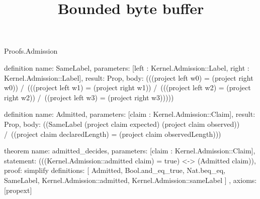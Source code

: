 \begin{lexlean}{Proofs.Admission}
\title{Bounded byte buffer}
\begin{semanticmodule}
definition{
  name: SameLabel,
  parameters: [left : Kernel.Admission::Label, right : Kernel.Admission::Label],
  result: Prop,
  body: (((project left w0) = (project right w0)) /\ (((project left w1) = (project right w1)) /\ (((project left w2) = (project right w2)) /\ ((project left w3) = (project right w3)))))
}

definition{
  name: Admitted,
  parameters: [claim : Kernel.Admission::Claim],
  result: Prop,
  body: ((SameLabel (project claim expected) (project claim observed)) /\ ((project claim declaredLength) = (project claim observedLength)))
}

theorem{
  name: admitted_decides,
  parameters: [claim : Kernel.Admission::Claim],
  statement: (((Kernel.Admission::admitted claim) = true) <-> (Admitted claim)),
  proof: simplify{
    definitions: [
      Admitted,
      Bool.and_eq_true,
      Nat.beq_eq,
      SameLabel,
      Kernel.Admission::admitted,
      Kernel.Admission::sameLabel
    ]
  },
  axioms: [propext]
}
\end{semanticmodule}
\end{lexlean}
